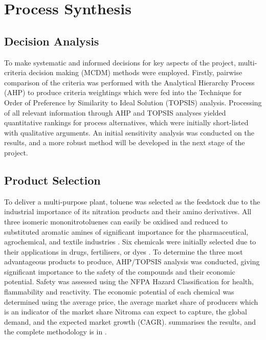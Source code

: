 \section{Process Synthesis }
\label{sec:synthesis}
\subsection{Decision Analysis}

To make systematic and informed decisions for key aspects of the project, multi-criteria decision making (MCDM) methods were employed. Firstly, pairwise comparison of the criteria was performed with the Analytical Hierarchy Process (AHP) to produce criteria weightings which were fed into the Technique for Order of Preference by Similarity to Ideal Solution (TOPSIS) analysis. Processing of all relevant information through AHP and TOPSIS analyses yielded quantitative rankings for process alternatives, which were initially short-listed with qualitative arguments. An initial sensitivity analysis was conducted on the results, and a more robust method will be developed in the next stage of the project.


\subsection{Product Selection}
To deliver a multi-purpose plant, toluene was selected as the feedstock due to the industrial importance of its nitration products and their amino derivatives. All three isomeric mononitrotoluenes can easily be oxidised and reduced to substituted aromatic amines of significant importance for the pharmaceutical, agrochemical, and textile industries \cite{dugal_nitrobenzene_2005}. Six chemicals were initially selected due to their applications in drugs, fertilisers, or dyes \cite{bowers_toluidines_2000,bruhne_benzaldehyde_2011,maki_benzoic_2000}. To determine the three most advantageous products to produce, AHP/TOPSIS analysis was conducted, giving significant importance to the safety of the compounds and their economic potential. Safety was assessed using the NFPA Hazard Classification for health, flammability and reactivity. The economic potential of each chemical was determined using the average price, the average market share of producers which is an indicator of the market share Nitroma can expect to capture, the global demand, and the expected market growth (CAGR).  summarises the results, and the complete methodology is in .

